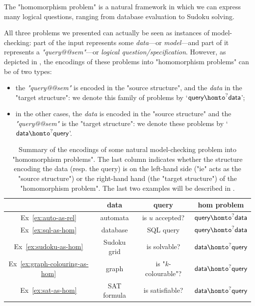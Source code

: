 \begin{known}
	The "homomorphism problem" is a natural framework in which we can express many
	logical questions, ranging from database evaluation to Sudoku solving.
\end{known}

All three problems we presented can actually be seen as instances of model-checking:
part of the input represents some \emph{data}---or \emph{model}---and part of it represents a
\emph{"query@@sem"}---or \emph{logical question/specification}.
However, as depicted in , 
the encodings of these problems into "homomorphism problems" can be of two types:
\begin{itemize}
	\item the \emph{"query@@sem"} is encoded in the "source structure",
		and the \emph{data} in the "target structure": we denote
		this family of problems by `$\textsf{query} \homto^? \textsf{data}$';
	\item in the other cases, the \emph{data} is encoded in the "source structure"
		and the \emph{"query@@sem"} is the "target structure": we denote
		these problems by `$\textsf{data} \homto^? \textsf{query}$'.
\end{itemize}
\begin{table}[h]
	\centering
	\begin{tabular}{cccc}
		\toprule 
		& data & query & hom problem \\ \midrule 
		Ex~\ref{ex:auto-as-rel} & automata & is $u$ accepted? & $\textsf{query} \homto^? \textsf{data}$ \\
		Ex~\ref{ex:sql-as-hom} & database & SQL query & $\textsf{query} \homto^? \textsf{data}$ \\
		Ex~\ref{ex:sudoku-as-hom} & Sudoku grid & is solvable? & $\textsf{data} \homto^? \textsf{query}$ \\
		Ex~\ref{ex:graph-colouring-as-hom} & graph &
		is "$k$-colourable"? & $\textsf{data} \homto^? \textsf{query}$ \\
		Ex~\ref{ex:sat-as-hom} & SAT formula &
		is satisfiable? & $\textsf{data} \homto^? \textsf{query}$ \\ \bottomrule
	\end{tabular}
	\caption{\AP\label{tab:examples-encodings-in-hom}
		Summary of the encodings of some
		natural model-checking problem into "homomorphism problems".
		The last column indicates whether the structure encoding the data
		(resp. the query) is on the left-hand side ("ie" acts as the "source structure")
		or the right-hand hand (the "target structure")
		of the "homomorphism problem".
		The last two examples will be described in .
	}
\end{table}

